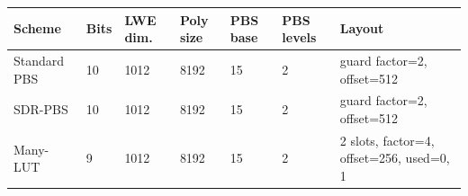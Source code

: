 \small
\setlength{\tabcolsep}{4pt}
\begin{tabular}{lllllll}
\toprule
Scheme & Bits & LWE dim. & Poly size & PBS base & PBS levels & Layout \\
\midrule
Standard PBS & 10 & 1012 & 8192 & 15 & 2 & guard factor=2, offset=512 \\
SDR-PBS & 10 & 1012 & 8192 & 15 & 2 & guard factor=2, offset=512 \\
Many-LUT & 9 & 1012 & 8192 & 15 & 2 & 2 slots, factor=4, offset=256, used=0, 1 \\
\bottomrule
\end{tabular}
